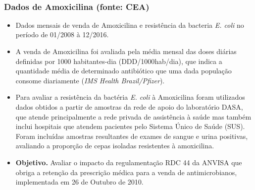 \documentclass[
]{book}
\begin{document}
\(~\)

\hypertarget{dados-de-amoxicilina-fonte-cea}{%
\subsubsection{Dados de Amoxicilina (fonte: CEA)}\label{dados-de-amoxicilina-fonte-cea}}

\begin{itemize}
\item
  Dados mensais de venda de Amoxicilina e resistência da bacteria \emph{E. coli} no período de 01/2008 à 12/2016.
\item
  A venda de Amoxicilina foi avaliada pela média mensal das doses diárias definidas por 1000 habitantes-dia (DDD/1000hab/dia), que indica a quantidade média de determinado antibiótico que uma dada população consome diariamente (\emph{IMS Health Brazil/Pfizer}).
\item
  Para avaliar a resistência da bactéria \emph{E. coli} à Amoxicilina foram utilizados dados obtidos a partir de amostras da rede de apoio do laboratório DASA, que atende principalmente a rede privada de assistência à saúde mas também inclui hospitais que atendem pacientes pelo Sistema Único de Saúde (SUS). Foram
  incluídas amostras resultantes de exames de sangue e urina positivas, avaliando a proporção de cepas isoladas resistentes à amoxicilina.
\item
  \textbf{Objetivo.} Avaliar o impacto da regulamentação RDC 44 da ANVISA que
  obriga a retenção da prescrição médica para a venda de antimicrobianos, implementada em 26 de Outubro de 2010.
\end{itemize}
\end{document}
